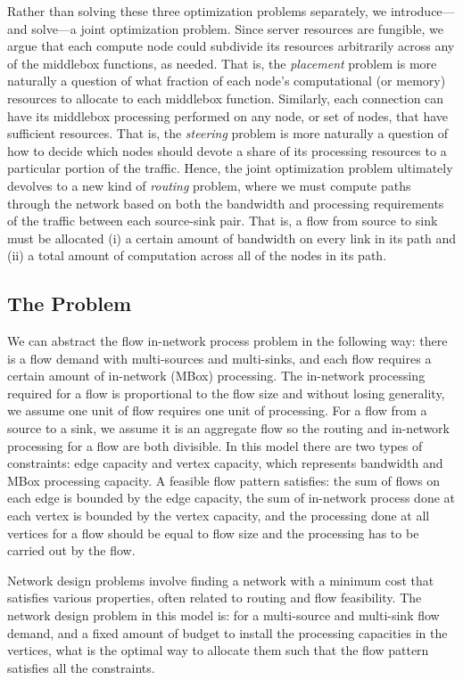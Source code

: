 \documentclass[11pt]{article}
\begin{document}
Rather than solving these three optimization problems separately, we introduce---and solve---a joint optimization problem.  Since server resources are fungible, we argue that each compute node could subdivide its resources arbitrarily across any of the middlebox functions, as needed.  That is, the \emph{placement} problem is more naturally a question of what fraction of each node's computational (or memory) resources to allocate to each middlebox function.  Similarly, each connection can have its middlebox processing performed on any node, or set of nodes, that have sufficient resources.  That is, the \emph{steering} problem is more naturally a question of how to decide which nodes should devote a share of its processing resources to a particular portion of the traffic.  Hence, the joint optimization problem ultimately devolves to a new kind of \emph{routing} problem, where we must compute paths through the network based on both the bandwidth and processing requirements of the traffic between each source-sink pair.  That is, a flow from source to sink must be allocated (i) a certain amount of bandwidth on every link in its path and (ii) a total amount of computation across all of the nodes in its path.

\subsection{The Problem}
We can abstract the flow in-network process problem in the following way: there is a flow demand with multi-sources and multi-sinks, and each flow requires a certain amount of in-network (MBox) processing. The in-network processing required for a flow is proportional to the flow size and without losing generality, we assume one unit of flow requires one unit of processing. For a flow from a source to a sink, we assume it is an aggregate flow so the routing and in-network processing for a flow are both divisible. In this model there are two types of constraints: edge capacity and vertex capacity, which represents bandwidth and MBox processing capacity. A feasible flow pattern satisfies: the sum of flows on each edge is bounded by the edge capacity, the sum of in-network process done at each vertex is bounded by the vertex capacity, and the processing done at all vertices for a flow should be equal to flow size and the processing has to be carried out by the flow.

Network design problems involve finding a network with a minimum cost that satisfies various properties, often related to routing and flow feasibility. The network design problem in this model is: for a multi-source and multi-sink flow demand, and a fixed amount of budget to install the processing capacities in the vertices, what is the optimal way to allocate them such that the flow pattern satisfies all the constraints.
\end{document}
